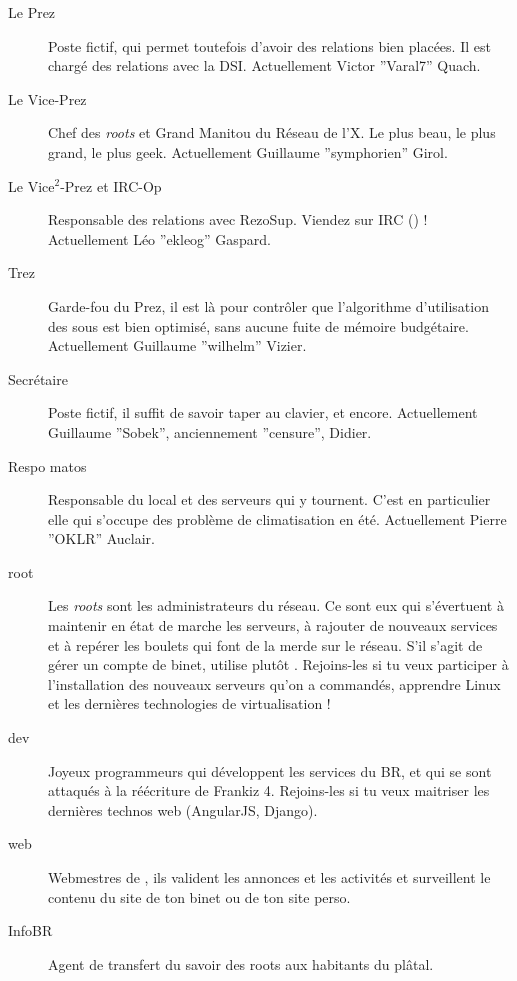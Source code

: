 \begin{description}
  \item[Le Prez]{Poste fictif, qui permet toutefois d'avoir des relations bien placées. Il est chargé des relations avec la DSI. Actuellement Victor ''Varal7'' Quach.}

  \item[Le Vice-Prez]{Chef des \emph{roots} et Grand Manitou du Réseau de l'X. Le plus beau, le plus grand, le plus geek. Actuellement Guillaume ''symphorien'' Girol.}

  \item[Le Vice$^2$-Prez et IRC-Op]{Responsable des relations avec RezoSup. Viendez sur IRC () ! \linebreak Actuellement Léo ''ekleog'' Gaspard.}

  \item[Trez]{Garde-fou du Prez, il est là pour contrôler que l'algorithme d'utilisation des sous est bien optimisé, sans aucune fuite de mémoire budgétaire. Actuellement Guillaume ''wilhelm'' Vizier.}

  \item[Secrétaire]{Poste fictif, il suffit de savoir taper au clavier, et encore. Actuellement Guillaume ''Sobek'', anciennement ''censure'', Didier.}

  \item[Respo matos]{Responsable du local et des serveurs qui y tournent. C'est en particulier elle qui s'occupe des problème de climatisation en été. Actuellement Pierre ''OKLR'' Auclair.}

  \item[root]{Les \emph{roots} sont les administrateurs du réseau. Ce sont eux qui s'évertuent à maintenir en état de marche les serveurs, à rajouter de
  nouveaux services et à repérer les boulets qui font de la merde sur le réseau. S'il s'agit de gérer un compte de binet, utilise plutôt . Rejoins-les si tu veux participer à l'installation des nouveaux serveurs qu'on a commandés, apprendre Linux et les dernières technologies de virtualisation !}

  \item[dev]{Joyeux programmeurs qui développent les services du BR, et qui se sont attaqués à la réécriture de Frankiz 4. Rejoins-les si tu veux maitriser les dernières technos web (AngularJS, Django).}

  \item[web]{Webmestres de \fkz, ils valident les annonces et les activités et surveillent le contenu du site de ton binet ou de ton site perso.}

  \item[InfoBR]{Agent de transfert du savoir des roots aux habitants du plâtal.}
\end{description}

